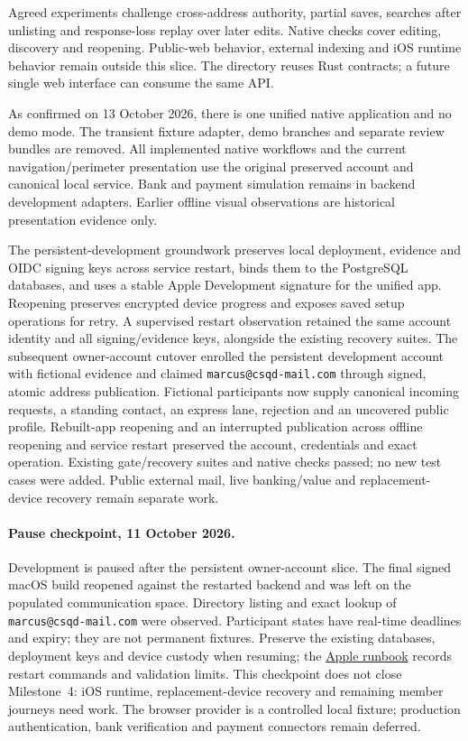 \documentclass[11pt]{article}
\begin{document}
Agreed experiments challenge cross-address authority, partial saves, searches after
unlisting and response-loss replay over later edits. Native checks cover editing,
discovery and reopening. Public-web behavior, external indexing and iOS runtime
behavior remain outside this slice. The directory reuses Rust contracts; a future
single web interface can consume the same API.

As confirmed on 13 October 2026, there is one unified native application and no
demo mode. The transient fixture adapter, demo branches and separate review bundles
are removed. All implemented native workflows and the current navigation/perimeter
presentation use the original preserved account and canonical local service. Bank
and payment simulation remains in backend development adapters. Earlier offline
visual observations are historical presentation evidence only.

The persistent-development groundwork preserves local deployment, evidence and
OIDC signing keys across service restart, binds them to the PostgreSQL databases,
and uses a stable Apple Development signature for the unified app. Reopening
preserves encrypted device progress and exposes saved setup operations for retry.
A supervised restart observation retained the same account identity and all
signing/evidence keys, alongside the existing recovery suites. The subsequent owner-account cutover enrolled the persistent development account
with fictional evidence and claimed \texttt{marcus@csqd-mail.com} through signed,
atomic address publication. Fictional participants now supply canonical incoming
requests, a standing contact, an express lane, rejection and an uncovered public
profile. Rebuilt-app reopening and an interrupted publication across offline
reopening and service restart preserved the account, credentials and exact
operation. Existing gate/recovery suites and native checks passed; no new test
cases were added. Public external mail, live banking/value and replacement-device
recovery remain separate work.


\paragraph{Pause checkpoint, 11 October 2026.} Development is paused after the
persistent owner-account slice. The final signed macOS build reopened against the
restarted backend and was left on the populated communication space. Directory
listing and exact lookup of \texttt{marcus@csqd-mail.com} were observed.
Participant states have real-time deadlines and expiry; they are not permanent
fixtures. Preserve the existing databases, deployment keys and device custody
when resuming; the \href{apps/cs-mail-apple/README.md}{Apple runbook} records restart
commands and validation limits. This checkpoint does not close Milestone~4:
iOS runtime, replacement-device recovery and remaining member journeys need work.
The browser provider is a controlled local fixture; production authentication,
bank verification and payment connectors remain deferred.
\end{document}
